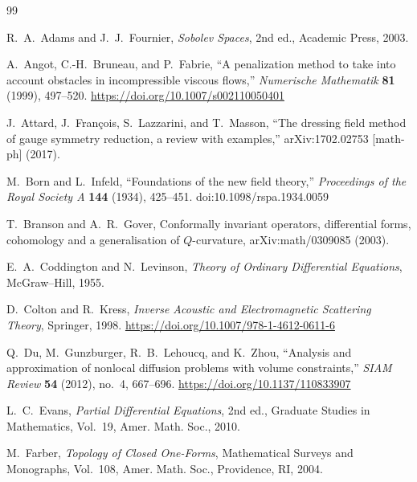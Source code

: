 \documentclass[preprint,12pt]{elsarticle}
\theoremstyle{plain}
\theoremstyle{definition}
\theoremstyle{note}
\begin{document}
\begin{thebibliography}{99}

R.~A.~Adams and J.~J.~Fournier,
\newblock \emph{Sobolev Spaces}, 2nd ed.,
\newblock Academic Press, 2003.

A.~Angot, C.-H.~Bruneau, and P.~Fabrie,
\newblock ``A penalization method to take into account obstacles in incompressible viscous flows,''
\newblock \emph{Numerische Mathematik} \textbf{81} (1999), 497--520.
\newblock \url{https://doi.org/10.1007/s002110050401}

J.~Attard, J.~Fran{\c c}ois, S.~Lazzarini, and T.~Masson,
\newblock ``The dressing field method of gauge symmetry reduction, a review with examples,''
\newblock arXiv:1702.02753 [math-ph] (2017).

M.~Born and L.~Infeld,
\newblock ``Foundations of the new field theory,''
\newblock \emph{Proceedings of the Royal Society A} \textbf{144} (1934), 425--451.
\newblock doi:10.1098/rspa.1934.0059

T.~Branson and A.~R.~Gover,
\newblock Conformally invariant operators, differential forms, cohomology and a generalisation of $Q$-curvature,
\newblock arXiv:math/0309085 (2003).

E.~A.~Coddington and N.~Levinson,
\newblock \emph{Theory of Ordinary Differential Equations},
\newblock McGraw--Hill, 1955.

D.~Colton and R.~Kress,
\newblock \emph{Inverse Acoustic and Electromagnetic Scattering Theory},
\newblock Springer, 1998.
\newblock \url{https://doi.org/10.1007/978-1-4612-0611-6}

Q.~Du, M.~Gunzburger, R.~B.~Lehoucq, and K.~Zhou,
\newblock ``Analysis and approximation of nonlocal diffusion problems with volume constraints,''
\newblock \emph{SIAM Review} \textbf{54} (2012), no.~4, 667--696.
\newblock \url{https://doi.org/10.1137/110833907}

L.~C.~Evans,
\newblock \emph{Partial Differential Equations}, 2nd ed.,
\newblock Graduate Studies in Mathematics, Vol.~19, Amer. Math. Soc., 2010.

M.~Farber,
\newblock \emph{Topology of Closed One-Forms},
\newblock Mathematical Surveys and Monographs, Vol.~108, Amer. Math. Soc., Providence, RI, 2004.


\end{thebibliography}
\end{document}
